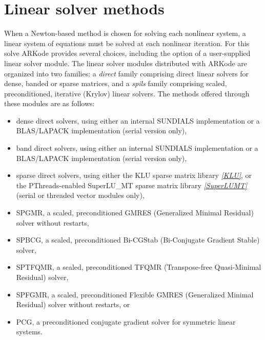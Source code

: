 \documentclass[letterpaper,10pt,english]{sphinxmanual}
\begin{document}
\section{Linear solver methods}
\label{Mathematics:linear-solver-methods}\label{Mathematics:mathematics-linear}
When a Newton-based method is chosen for solving each nonlinear
system, a linear system of equations must be solved at each nonlinear
iteration.  For this solve ARKode provides several choices, including
the option of a user-supplied linear solver module.  The linear solver
modules distributed with ARKode are organized into two families: a
\emph{direct} family comprising direct linear solvers for dense, banded or
sparse matrices, and a \emph{spils} family comprising scaled, preconditioned,
iterative (Krylov) linear solvers.  The methods offered through these
modules are as follows:
\begin{itemize}
\item {} 
dense direct solvers, using either an internal SUNDIALS
implementation or a BLAS/LAPACK implementation (serial version
only),

\item {} 
band direct solvers, using either an internal SUNDIALS
implementation or a BLAS/LAPACK implementation (serial version
only),

\item {} 
sparse direct solvers, using either the KLU sparse matrix library
\label{Mathematics:id3}{\hyperref[References:klu]{\emph{{[}KLU{]}}}}, or the PThreads-enabled SuperLU\_MT sparse matrix library
\label{Mathematics:id4}{\hyperref[References:superlumt]{\emph{{[}SuperLUMT{]}}}} (serial or threaded vector modules only),

\item {} 
SPGMR, a scaled, preconditioned GMRES (Generalized Minimal Residual)
solver without restarts,

\item {} 
SPBCG, a scaled, preconditioned Bi-CGStab (Bi-Conjugate Gradient
Stable) solver,

\item {} 
SPTFQMR, a scaled, preconditioned TFQMR (Transpose-free
Quasi-Minimal Residual) solver,

\item {} 
SPFGMR, a scaled, preconditioned Flexible GMRES (Generalized Minimal
Residual) solver without restarts, or

\item {} 
PCG, a preconditioned conjugate gradient solver for symmetric linear
systems.

\end{itemize}
\end{document}
